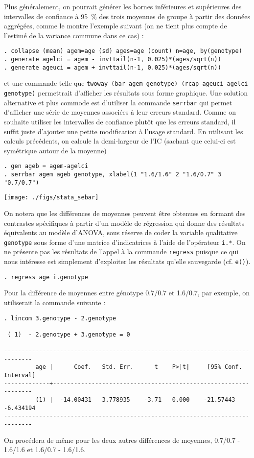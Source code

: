 Plus généralement, on pourrait générer les bornes inférieures et supérieures
des intervalles de confiance à 95~\% des trois moyennes de groupe à partir
des données aggrégées, comme le montre l'exemple suivant (on ne tient plus
compte de l'estimé de la variance commune dans ce cas) :
\begin{verbatim}
. collapse (mean) agem=age (sd) ages=age (count) n=age, by(genotype)
. generate agelci = agem - invttail(n-1, 0.025)*(ages/sqrt(n))
. generate ageuci = agem + invttail(n-1, 0.025)*(ages/sqrt(n))
\end{verbatim}
et une commande telle que \verb|twoway (bar agem genotype) (rcap ageuci agelci genotype)|
permettrait d'afficher les résultats sous forme graphique. Une solution
alternative et plus commode est d'utiliser la commande \texttt{serrbar}  qui
permet d'afficher une série de moyennes associées à leur erreurs
standard. Comme on souhaite utiliser les intervalles de confiance plutôt que
les erreurs standard, il suffit juste d'ajouter une petite modification à
l'usage standard. En utilisant les calculs précédents, on calcule la
demi-largeur de l'IC (sachant que celui-ci est symétrique autour de la moyenne)
\begin{verbatim}
. gen ageb = agem-agelci
. serrbar agem ageb genotype, xlabel(1 "1.6/1.6" 2 "1.6/0.7" 3 "0.7/0.7")
\end{verbatim}

\texttt{[image: ./figs/stata\_sebar]}


On notera que les différences de moyennes peuvent être obtenues en formant
des contrastes spécifiques à partir d'un modèle de régression qui donne des
résultats équivalents au modèle d'ANOVA, sous réserve de coder la variable
qualitative \texttt{genotype} sous forme d'une matrice d'indicatrices à
l'aide de l'opérateur \verb|i.*|. On ne présente pas les résultats de
l'appel à la commande \texttt{regress} puisque ce qui nous intéresse est
simplement d'exploiter les résultats qu'elle sauvegarde (cf. \verb|e()|).
\begin{verbatim}
. regress age i.genotype
\end{verbatim}

Pour la différence de moyennes entre génotype 0.7/0.7 et 1.6/0.7, par
exemple, on utiliserait la commande suivante :
\begin{verbatim}
. lincom 3.genotype - 2.genotype

 ( 1)  - 2.genotype + 3.genotype = 0

------------------------------------------------------------------------------
         age |      Coef.   Std. Err.      t    P>|t|     [95% Conf. Interval]
-------------+----------------------------------------------------------------
         (1) |  -14.00431   3.778935    -3.71   0.000    -21.57443   -6.434194
------------------------------------------------------------------------------
\end{verbatim}
On procédera de même pour les deux autres différences de moyennes, 0.7/0.7 -
1.6/1.6 et 1.6/0.7 - 1.6/1.6.

